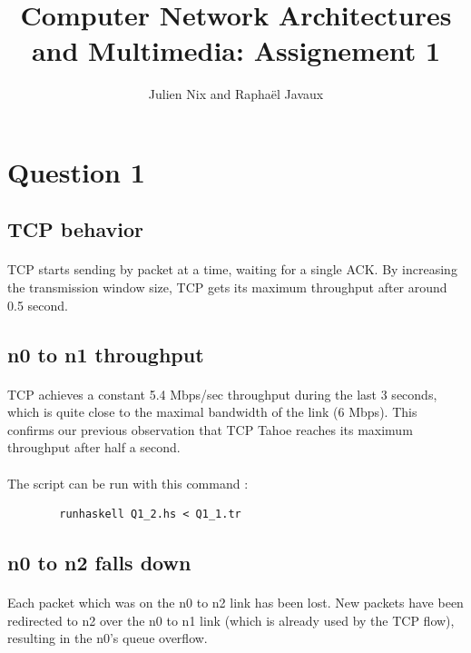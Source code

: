\documentclass[a4paper]{article}
\title{Computer Network Architectures and Multimedia: Assignement 1}
\author{Julien Nix and Raphaël Javaux}
\date{}
\begin{document}
\maketitle

 \section{Question 1}

   \subsection{TCP behavior}

    \paragraph{}TCP starts sending by packet at a time, waiting for a single ACK.
By increasing the transmission window size, TCP gets its maximum throughput
after around 0.5 second.

   \subsection{n0 to n1 throughput}

    \paragraph{}TCP achieves a constant 5.4 Mbps/sec throughput during the last
3 seconds, which is quite close to the maximal bandwidth of the link (6 Mbps).
This confirms our previous observation that TCP Tahoe reaches its maximum
throughput after half a second.

    \paragraph{}The script can be run with this command :
    \begin{verbatim}
        runhaskell Q1_2.hs < Q1_1.tr
    \end{verbatim}

   \subsection{n0 to n2 falls down}

   \paragraph{}Each packet which was on the n0 to n2 link has been lost.
New packets have been redirected to n2 over the n0 to n1 link (which is already
used by the TCP flow), resulting in the n0's queue overflow.
\end{document}
